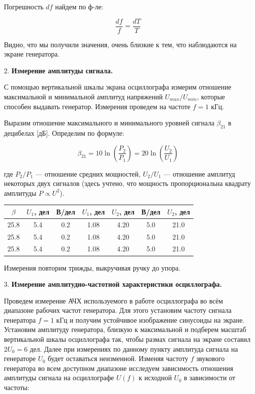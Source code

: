 \documentclass[14pt]{article}
\begin{document}
Погрешность $df$ найдем по ф-ле: 

$$\frac{df}{f} = \frac{dT}{T}$$

Видно, что мы получили значения, очень близкие к тем, что наблюдаются на экране генератора.

\vspace{0.5cm}
2. \textbf{Измерение амплитуды сигнала.} 

С помощью вертикальной шкалы экрана осциллографа измерим отношение максимальной и минимальной амплитуд напряжений $U_{max}/U_{min}$, которые способен выдавать генератор. Измерения проведем на частоте $f = 1$ кГц.

Выразим отношение максимального и минимального уровней сигнала $\beta_{21}$ в децибелах [дБ]. Определим по формуле:

$$\beta_{21} = 10 \ln\left(\frac{P_2}{P_1}\right) = 20 \ln\left(\frac{U_2}{U_1}\right)$$

где $P_2/P_1$ — отношение средних мощностей, $U_2/U_1$ — отношение амплитуд некоторых двух сигналов (здесь учтено, что мощность пропорциональна квадрату амплитуды $P \propto U^2$).

%
%

\begin{center}
\begin{tabular}{|c|c|c|c|c|c|c|}
\hline
$\beta$		&	$U_1$, дел	&	В/дел	&	$U_1$, дел	&	$U_2$, дел	&	В/дел	&	$U_2$, дел\\
\hline
25.8		&	5.4			&	0.2		&	1.08		&	4.20		&	5.0		&	21.0\\
\hline
25.8		&	5.4			&	0.2		&	1.08		&	4.20		&	5.0		&	21.0\\
\hline
25.8		&	5.4			&	0.2		&	1.08		&	4.20		&	5.0		&	21.0\\
\hline
\end{tabular}
\end{center}

Измерения повторим трижды, выкручивая ручку до упора.

\vspace{0.5cm}
3. \textbf{Измерение амплитудно-частотной характеристики осциллографа.} 

Проведем измерение АЧХ используемого в работе осциллографа во всём диапазоне рабочих частот генератора. Для этого установим частоту сигнала генератора $f = 1$ кГц и получим устойчивое изображение синусоиды на экране. Установим амплитуду генератора, близкую к максимальной и подберем масштаб вертикальной шкалы осциллографа так, чтобы размах сигнала на экране составил $2U_0 = 6$ дел. Далее при измерениях по данному пункту амплитуда сигнала на генераторе $U_0$ будет оставаться неизменной. Изменяя частоту $f$ звукового генератора во всем доступном диапазоне исследуем зависимость отношения амплитуды сигнала на осциллографе $U(f)$ к исходной $U_0$ в зависимости от частоты:
\end{document}

